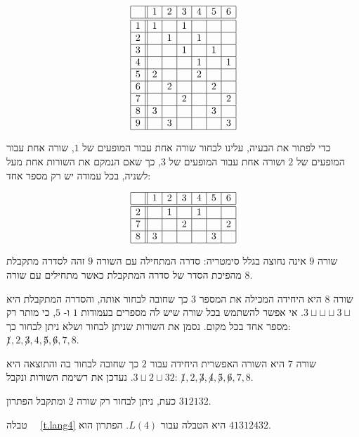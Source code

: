 \[
\begin{array}{|c||c|c|c|c|c|c|}
\hline
&1&2&3&4&5&6\\\hline\hline
1&1&&1&&&\\\hline
2&&1&&1&&\\\hline
3&&&1&&1&\\\hline
4&&&&1&&1\\\hline
5&2&&&2&&\\\hline
6&&2&&&2&\\\hline
7&&&2&&&2\\\hline
8&3&&&&3&\\\hline
9&&3&&&&3\\\hline
\end{array}
\]


כדי לפתור את הבעיה, עלינו לבחור שורה אחת עבור המופעים של
$1$,
שורה אחת עבור המופעים של
$2$
ושורה אחת עבור המופעים של
$3$,
כך שאם הנמקם את השורות אחת מעל לשניה, בכל עמודה יש רק מספר אחד: 

\[
\begin{array}{|c||c|c|c|c|c|c|}
\hline
&1&2&3&4&5&6\\\hline\hline
2&&1&&1&&\\\hline
7&&&2&&&2\\\hline
8&3&&&&3&\\\hline
\end{array}
\]


שורה
$9$
אינה נחוצה בגלל סימטריה: סדרה המתחילה עם השורה
$9$
זהה לסדרה מתקבלת מהפיכת הסדר של סדרה המתקבלת כאשר מתחילים עם שורה
$8$.

שורה 
$8$
היא היחידה המכילה את המספר
$3$
כך שחובה לבחור אותה, והסדרה המתקבלת היא
$3\sqcup  \sqcup  \sqcup  3\sqcup $. 
אי אפשר להשתמש בכל שורה שיש לה מספרים בעמודות
$1$
ו-
$5$,
כי מותר רק מספר אחד בכל מקום. נסמן את השורות שניתן לבחור ושלא ניתן לבחור כך:
$\not 1,2,\not 3,4,\not 5, \not 6, 7, 8$.

שורה
$7$
היא השורה האפשרית היחידה עבור
$2$
כך שחובה לבחור בה והתוצאה היא
$3\sqcup  2\sqcup  3{}2$.
נעדכן את רשימת השורות ונקבל:
$\not 1,2,\not 3,\not 4,\not 5, \not 6, 7, 8$.

כעת, ניתן לבחור רק שורה
$2$
ומתקבל הפתרון
$3{}1{}2{}1{}3{}2$.

טבלה~%
~\ref{t.lang4}
היא הטבלה עבור
$L(4)$.
הפתרון הוא
$41312432$.

